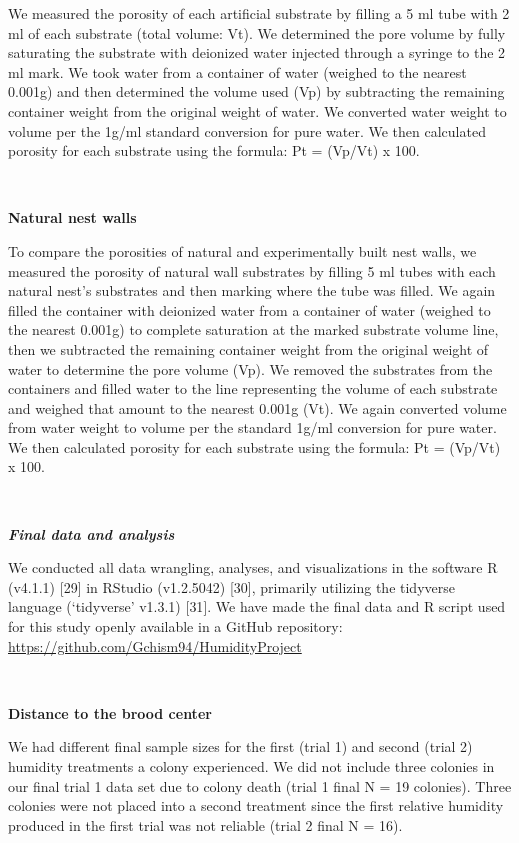 \documentclass[3p]{elsarticle} %
\begin{document}
We measured the porosity of each artificial substrate by filling a 5 ml
tube with 2 ml of each substrate (total volume: Vt). We determined the
pore volume by fully saturating the substrate with deionized water
injected through a syringe to the 2 ml mark. We took water from a
container of water (weighed to the nearest 0.001g) and then determined
the volume used (Vp) by subtracting the remaining container weight from
the original weight of water. We converted water weight to volume per
the 1g/ml standard conversion for pure water. We then calculated
porosity for each substrate using the formula: Pt = (Vp/Vt) x 100.

~

\textbf{Natural nest walls}

To compare the porosities of natural and experimentally built nest
walls, we measured the porosity of natural wall substrates by filling 5
ml tubes with each natural nest's substrates and then marking where the
tube was filled. We again filled the container with deionized water from
a container of water (weighed to the nearest 0.001g) to complete
saturation at the marked substrate volume line, then we subtracted the
remaining container weight from the original weight of water to
determine the pore volume (Vp). We removed the substrates from the
containers and filled water to the line representing the volume of each
substrate and weighed that amount to the nearest 0.001g (Vt). We again
converted volume from water weight to volume per the standard 1g/ml
conversion for pure water. We then calculated porosity for each
substrate using the formula: Pt = (Vp/Vt) x 100.

~

\textbf{\emph{Final data and analysis}}

We conducted all data wrangling, analyses, and visualizations in the
software R (v4.1.1) {[}29{]} in RStudio (v1.2.5042) {[}30{]}, primarily
utilizing the tidyverse language (`tidyverse' v1.3.1) {[}31{]}. We have
made the final data and R script used for this study openly available in
a GitHub repository: \url{https://github.com/Gchism94/HumidityProject}

~

\textbf{Distance to the brood center}

We had different final sample sizes for the first (trial 1) and second
(trial 2) humidity treatments a colony experienced. We did not include
three colonies in our final trial 1 data set due to colony death (trial
1 final N = 19 colonies). Three colonies were not placed into a second
treatment since the first relative humidity produced in the first trial
was not reliable (trial 2 final N = 16).
\end{document}
